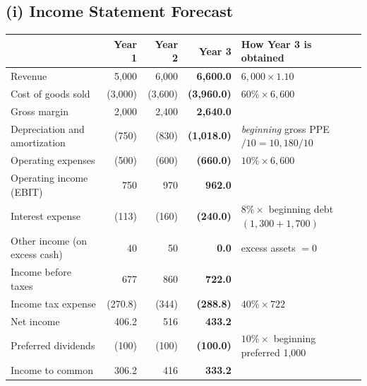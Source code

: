\subsection{(i) Income Statement Forecast}
\begin{center}
\footnotesize\setlength{\tabcolsep}{3.5pt}
\begin{tabular}{@{}lrr>{\bfseries}rl@{}}
\toprule
 & \textbf{Year 1} & \textbf{Year 2} & \textbf{Year 3} & \textbf{How Year 3 is obtained}\\
\midrule
Revenue & 5,000 & 6,000 & 6,600.0 & $6{,}000\times1.10$\\
Cost of goods sold & (3,000) & (3,600) & (3,960.0) & $60\%\times6{,}600$\\
Gross margin & 2,000 & 2,400 & 2,640.0 & \\
Depreciation and amortization & (750) & (830) & (1,018.0) & \emph{beginning} gross PPE$/10=10{,}180/10$\\
Operating expenses & (500) & (600) & (660.0) & $10\%\times6{,}600$\\
\midrule
Operating income (EBIT) & 750 & 970 & 962.0 & \\
Interest expense & (113) & (160) & (240.0) & $8\%\times$ beginning debt $(1{,}300+1{,}700)$\\
Other income (on excess cash) & 40 & 50 & 0.0 & excess assets $=0$\\
\midrule
Income before taxes & 677 & 860 & 722.0 & \\
Income tax expense & (270.8) & (344) & (288.8) & $40\%\times722$\\
\midrule
Net income & 406.2 & 516 & 433.2 & \\
Preferred dividends & (100) & (100) & (100.0) & $10\%\times$ beginning preferred 1,000\\
Income to common & 306.2 & 416 & 333.2 & \\
\bottomrule
\end{tabular}
\end{center}

